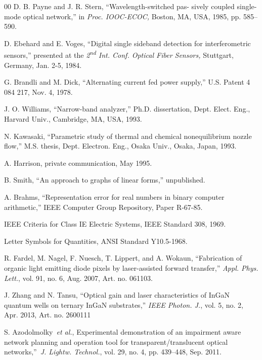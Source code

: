 \documentclass{ieeeaccess}
\begin{document}
\begin{thebibliography}{00}
 D. B. Payne and J. R. Stern, ``Wavelength-switched pas- sively coupled single-mode optical network,'' in \emph{Proc. IOOC-ECOC,} Boston, MA, USA, 1985, pp. 585--590.

 D. Ebehard and E. Voges, ``Digital single sideband detection for interferometric sensors,'' presented at the \emph{2\textsuperscript{nd} Int. Conf. Optical Fiber Sensors,} Stuttgart, Germany, Jan. 2-5, 1984.

 G. Brandli and M. Dick, ``Alternating current fed power supply,'' U.S. Patent 4 084 217, Nov. 4, 1978.

 J. O. Williams, ``Narrow-band analyzer,'' Ph.D. dissertation, Dept. Elect. Eng., Harvard Univ., Cambridge, MA, USA, 1993.

 N. Kawasaki, ``Parametric study of thermal and chemical nonequilibrium nozzle flow,'' M.S. thesis, Dept. Electron. Eng., Osaka Univ., Osaka, Japan, 1993.

 A. Harrison, private communication, May 1995.

 B. Smith, ``An approach to graphs of linear forms,'' unpublished.

 A. Brahms, ``Representation error for real numbers in binary computer arithmetic,'' IEEE Computer Group Repository, Paper R-67-85.

 IEEE Criteria for Class IE Electric Systems, IEEE Standard 308, 1969.

 Letter Symbols for Quantities, ANSI Standard Y10.5-1968.

 R. Fardel, M. Nagel, F. Nuesch, T. Lippert, and A. Wokaun, ``Fabrication of organic light emitting diode pixels by laser-assisted forward transfer,'' \emph{Appl. Phys. Lett.}, vol. 91, no. 6, Aug. 2007, Art. no. 061103.~

 J. Zhang and N. Tansu, ``Optical gain and laser characteristics of InGaN quantum wells on ternary InGaN substrates,'' \emph{IEEE Photon. J.}, vol. 5, no. 2, Apr. 2013, Art. no. 2600111

 S. Azodolmolky~\emph{et al.}, Experimental demonstration of an impairment aware network planning and operation tool for transparent/translucent optical networks,''~\emph{J. Lightw. Technol.}, vol. 29, no. 4, pp. 439--448, Sep. 2011.

\end{thebibliography}
\end{document}
